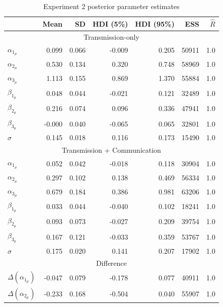 \documentclass[doc,biblatex]{apa7}
\begin{document}
\clearpage

\begin{table}
\begin{center}
\begin{threeparttable}
\caption{Experiment 2 posterior parameter estimates}
\footnotesize
\begin{tabular}{lrrrrrr}
\toprule
 &   Mean &     SD &  HDI (5\%) &  HDI (95\%) &  ESS &  $\hat{R}$ \\
\midrule
\multicolumn{7}{c}{Transmission-only} \\
$\alpha_{1_\mu}$ &  0.099 &  0.066 &  -0.009 &    0.205 &   50911 &    1.0 \\
$\alpha_{2_\mu}$ &  0.530 &  0.134 &   0.320 &    0.748 &   58969 &    1.0 \\
$\alpha_{3_\mu}$ &  1.113 &  0.155 &   0.869 &    1.370 &   55884 &    1.0 \\
$\beta_{1_\mu}$ &  0.048 &  0.044 &  -0.021 &    0.121 &   32489 &    1.0 \\
$\beta_{2_\mu}$ &  0.216 &  0.074 &   0.096 &    0.336 &   47941 &    1.0 \\
$\beta_{3_\mu}$ & -0.000 &  0.040 &  -0.065 &    0.065 &   32801 &    1.0 \\
$\sigma$      &  0.145 &  0.018 &   0.116 &    0.173 &   15490 &    1.0 \\
\midrule
\multicolumn{7}{c}{Transmission + Communication} \\
$\alpha_{1_\mu}$ &  0.052 &  0.042 &  -0.018 &    0.118 &   30904 &    1.0 \\
$\alpha_{2_\mu}$ &  0.297 &  0.102 &   0.138 &    0.469 &   56334 &    1.0 \\
$\alpha_{3_\mu}$ &  0.679 &  0.184 &   0.386 &    0.981 &   63206 &    1.0 \\
$\beta_{1_\mu}$ &  0.033 &  0.044 &  -0.040 &    0.102 &   18241 &    1.0 \\
$\beta_{2_\mu}$ &  0.093 &  0.073 &  -0.027 &    0.209 &   39754 &    1.0 \\
$\beta_{3_\mu}$ &  0.167 &  0.121 &  -0.033 &    0.359 &   53767 &    1.0 \\
$\sigma$      &  0.175 &  0.020 &   0.141 &    0.207 &   17902 &    1.0 \\
\midrule
\multicolumn{7}{c}{Difference} \\
$\Delta(\alpha_{1_\mu})$     & -0.047 &  0.079 &  -0.178 &    0.077 &   40911 &    1.0 \\
$\Delta(\alpha_{2_\mu})$     & -0.233 &  0.168 &  -0.504 &    0.040 &   55907 &    1.0 \\

\end{tabular}
\end{threeparttable}
\end{center}
\end{table}
\end{document}
